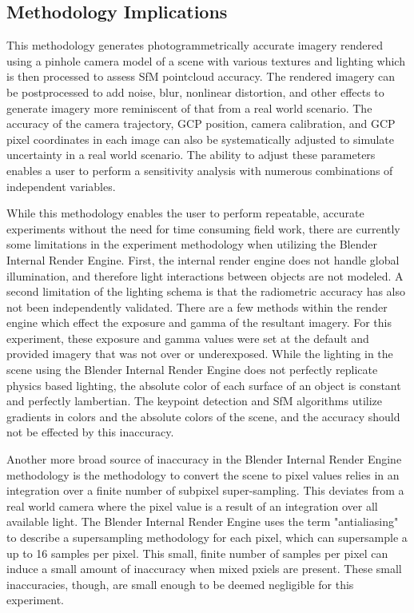 \subsection{Methodology Implications}
This methodology generates photogrammetrically accurate imagery rendered using a pinhole camera model of a scene with various textures and lighting  which is then processed to assess SfM pointcloud accuracy.  The rendered imagery can be postprocessed to add noise, blur, nonlinear distortion, and other effects to generate imagery more reminiscent of that from a real world scenario.  The accuracy of the camera trajectory, GCP position, camera calibration, and GCP pixel coordinates in each image can also be systematically adjusted to simulate uncertainty in a real world scenario.  The ability to adjust these parameters enables a user to perform a sensitivity analysis with numerous combinations of independent variables. 

While this methodology enables the user to perform repeatable, accurate experiments without the need for time consuming field work, there are currently some limitations in the experiment methodology when utilizing the Blender Internal Render Engine.  First, the internal render engine does not handle global illumination, and therefore light interactions between objects are not modeled.  A second limitation of the lighting schema is that the radiometric accuracy has also not been independently validated.  There are a few methods within the render engine which effect the exposure and gamma of the resultant imagery. For this experiment, these exposure and gamma values were set at the default and provided imagery that was not over or underexposed. While the lighting in the scene using the Blender Internal Render Engine does not perfectly replicate physics based lighting, the absolute color of each surface of an object is constant and perfectly lambertian.  The keypoint detection and SfM algorithms utilize gradients in colors and the absolute colors of the scene, and the accuracy should not be effected by this inaccuracy.

Another more broad source of inaccuracy in the Blender Internal Render Engine methodology is the methodology to convert the scene to pixel values relies in an integration over a finite number of subpixel super-sampling.  This deviates from a real world camera where the pixel value is a result of an integration over all available light.  The Blender Internal Render Engine uses the term "antialiasing" to describe a supersampling methodology for each pixel, which can supersample a up to 16 samples per pixel.  This small, finite number of samples per pixel can induce a small amount of inaccuracy when mixed pxiels are present.  These small inaccuracies, though, are small enough to be deemed negligible for this experiment.  

